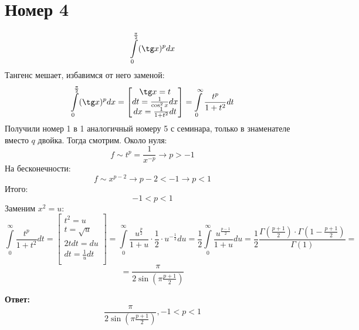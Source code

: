 \documentclass[a4paper,12pt]{article}
\begin{document}
\section*{Номер 4}
\[
\int\limits_0^{\frac{\pi}{2}} (\tg x)^p dx 
\]
Тангенс мешает, избавимся от него заменой:
\[
\int\limits_0^{\frac{\pi}{2}} (\tg x)^p dx  =
\begin{bmatrix}
\tg x = t \\
dt = \frac{1}{\cos^2 x} dx \\
dx = \frac{1}{1 + t^2} dt
\end{bmatrix}
=
\int\limits_0^{\infty} \frac{t^p}{1+t^2} dt
\]
Получили номер 1 в 1 аналогичный номеру 5 с семинара, только в знаменателе вместо $q$ двойка. Тогда смотрим.
Около нуля:
\[
f \sim t^p = \frac{1}{x^{-p}} \rightarrow p > - 1
\]
На бесконечности:
\[
f \sim x^{p - 2} \rightarrow p - 2 < -1 \rightarrow p < 1
\] 
Итого:
\[
-1 < p < 1 
\]
Заменим $x^2 = u$:
\[
\int\limits_0^{\infty} \frac{t^p}{1+t^2} dt = \begin{bmatrix}
t^2 = u \\
t = \sqrt{u}\\
2tdt = du \\
dt = \frac{1}{u} dt\\
\end{bmatrix}
=
\int\limits_0^{\infty} \frac{u^{\frac{p}{2}}}{1+u} \cdot \frac{1}{2} \cdot u^{-\frac{1}{2}} du = \frac{1}{2} \int\limits_0^{\infty} \frac{u^{\frac{p-1}{2}}}{1+u} du = \frac{1}{2} \frac{\Gamma \left(\frac{p+1}{2}\right) \cdot \Gamma \left(1 - \frac{p + 1}{2}\right)}{\Gamma(1)} = 
\]
\[
=
\frac{\pi}{2 \sin \left(\pi \frac{p + 1}{2}\right)}
\]
\begin{center}
\textbf{Ответ: } 
\[
\frac{\pi}{2 \sin \left(\pi \frac{p + 1}{2}\right)}, -1 < p < 1
\]
\end{center}
\end{document}

